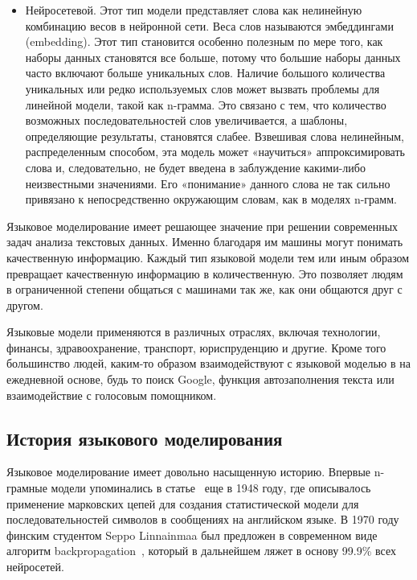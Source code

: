 \begin{itemize}
	\item Нейросетевой. Этот тип модели представляет слова как нелинейную комбинацию весов в нейронной сети. Веса слов называются эмбеддингами (embedding). Этот тип становится особенно полезным по мере того, как наборы данных становятся все больше, потому что большие наборы данных часто включают больше уникальных слов. Наличие большого количества уникальных или редко используемых слов может вызвать проблемы для линейной модели, такой как n-грамма. Это связано с тем, что количество возможных последовательностей слов увеличивается, а шаблоны, определяющие результаты, становятся слабее. Взвешивая слова нелинейным, распределенным способом, эта модель может «научиться» аппроксимировать слова и, следовательно, не будет введена в заблуждение какими-либо неизвестными значениями. Его «понимание» данного слова не так сильно привязано к непосредственно окружающим словам, как в моделях n-грамм.
\end{itemize}

Языковое моделирование имеет решающее значение при решении современных задач анализа текстовых данных. Именно благодаря им машины могут понимать качественную информацию. Каждый тип языковой модели тем или иным образом превращает качественную информацию в количественную. Это позволяет людям в ограниченной степени общаться с машинами так же, как они общаются друг с другом. 

Языковые модели применяются в различных отраслях, включая технологии, финансы, здравоохранение, транспорт, юриспруденцию и другие. Кроме того большинство людей, каким-то образом взаимодействуют с языковой моделью в на ежедневной основе, будь то поиск Google, функция автозаполнения текста или взаимодействие с голосовым помощником.~\cite{language_modeling_abstract}

\subsection{История языкового моделирования}

Языковое моделирование имеет довольно насыщенную историю. Впервые n-грамные модели упоминались в статье~\cite{shannon-math-theory-of-communication} еще в 1948 году, где описывалось применение марковских цепей для создания статистической модели для последовательностей символов в сообщениях на английском языке. В 1970 году финским студентом Seppo Linnainmaa был предложен в современном виде алгоритм backpropagation~\cite{backprop_first_mention}, который в дальнейшем ляжет в основу 99.9\% всех нейросетей.

